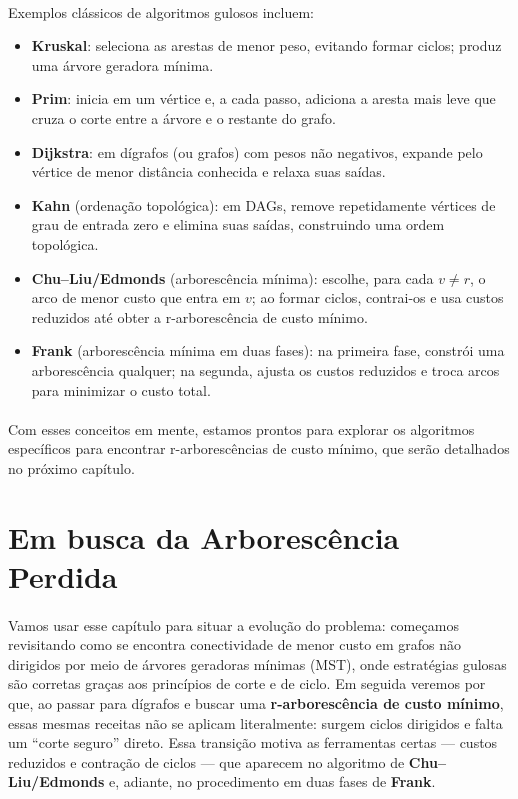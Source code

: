 \documentclass[12pt,a4paper]{article}
\def\emph#1{#1}%
\begin{document}
\paragraph{}
Exemplos clássicos de algoritmos gulosos incluem:

\begin{itemize}
    \item \textbf{Kruskal}: seleciona as arestas de menor peso, evitando formar ciclos; produz uma árvore geradora mínima.
    \item \textbf{Prim}: inicia em um vértice e, a cada passo, adiciona a aresta mais leve que cruza o corte entre a árvore e o restante do grafo.
    \item \textbf{Dijkstra}: em dígrafos (ou grafos) com pesos não negativos, expande pelo vértice de menor distância conhecida e relaxa suas saídas.
    \item  \textbf{Kahn} (ordenação topológica): em DAGs, remove repetidamente vértices de grau de entrada zero e elimina suas saídas, construindo uma ordem topológica.
    \item \textbf{Chu–Liu/Edmonds} (arborescência mínima): escolhe, para cada \(v\neq r\), o arco de menor custo que entra em \(v\); ao formar ciclos, contrai-os e usa custos reduzidos até obter a r-arborescência de custo mínimo.
    \item \textbf{Frank} (arborescência mínima em duas fases): na primeira fase, constrói uma arborescência qualquer; na segunda, ajusta os custos reduzidos e troca arcos para minimizar o custo total.
\end{itemize}

\paragraph{}
Com esses conceitos em mente, estamos prontos para explorar os algoritmos específicos para encontrar r-arborescências de custo mínimo, que serão detalhados no próximo capítulo.

\section{Em busca da Arborescência Perdida}

\paragraph{}
Vamos usar esse capítulo para situar a evolução do problema: começamos revisitando como se encontra conectividade de menor custo em grafos não dirigidos por meio de \emph{árvores geradoras mínimas} (MST), onde estratégias gulosas são corretas graças aos princípios de \emph{corte} e de \emph{ciclo}. Em seguida veremos por que, ao passar para \emph{dígrafos} e buscar uma \textbf{r-arborescência de custo mínimo}, essas mesmas receitas não se aplicam literalmente: surgem ciclos dirigidos e falta um “corte seguro” direto. Essa transição motiva as ferramentas certas — \emph{custos reduzidos} e \emph{contração de ciclos} — que aparecem no algoritmo de \textbf{Chu–Liu/Edmonds} e, adiante, no procedimento em duas fases de \textbf{Frank}.
\end{document}

